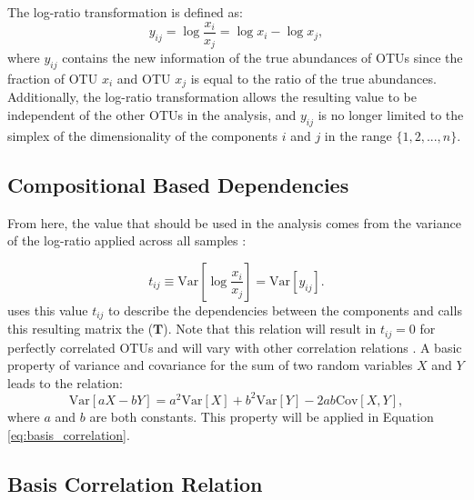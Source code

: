 
The log-ratio transformation is defined as:
\begin{equation} \label{eq:log}
    y_{ij} = \log \frac{x_i}{x_j} = \log x_i -\log x_j,
\end{equation}
where $y_{ij}$ contains the new information of the true abundances of \acrshort{OTU}s since the fraction of \acrshort{OTU} $x_i$ and \acrshort{OTU} $x_j$ is equal to the ratio of the true abundances. Additionally, the log-ratio transformation allows the resulting value to be independent of the other \acrshort{OTU}s in the analysis, and $y_{ij}$ is no longer limited to the simplex of the dimensionality of the components $i$ and $j$ in the range $\{1,2,...,n\}$. 

\subsection{Compositional Based Dependencies}\label{theory-dependencies}


From here, the value that should be used in the analysis comes from the variance of the log-ratio applied across all samples \citep{Aitchison2003}:

\begin{equation}\label{eq:tij_variance}
    t_{ij} \equiv \text{Var}\left[ \log \frac{x_i}{x_j} \right] = \text{Var} \left[ y_{ij} \right].
\end{equation}
\citeauthor{Aitchison2003} uses this value $t_{ij}$ to describe the dependencies between the components and calls this resulting matrix the  ($\textbf{T}$). Note that this relation will result in $t_{ij}=0$ for perfectly correlated \acrshort{OTU}s and will vary with other correlation relations \citep{Friedman2012}. A basic property of variance and covariance for the sum of two random variables $X$ and $Y$ leads to the relation:
\begin{equation}\label{eq:var_relation}
    \text{Var}\left[aX-bY \right] = a^2 \text{Var}\left[ X \right] + b^2 \text{Var} \left[Y\right]-2ab \text{Cov} \left[X, Y\right],
\end{equation}
where $a$ and $b$ are both constants. This property will be applied in Equation \ref{eq:basis_correlation}. 

\subsection{Basis Correlation Relation}\label{theory-basiscorr}

